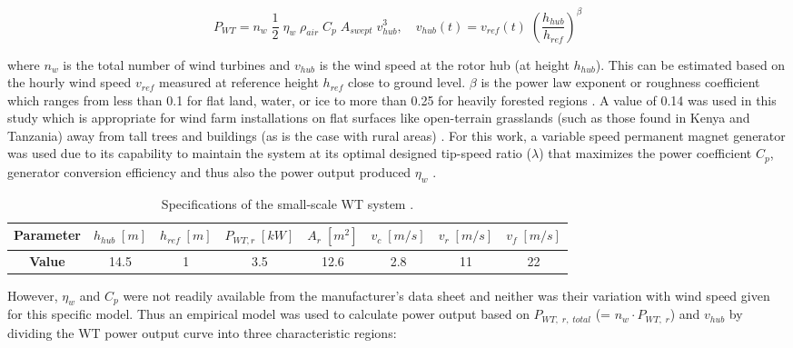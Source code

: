 \documentclass[final,3p,times]{elsarticle}
\begin{document}
\begin{equation}
\label{eq:Pwind}
    P_{WT} = n_w \; \frac{1}{2} \; \eta_w \; \rho_{air} \; C_p \; A_{swept} \; v_{hub}^3, \quad v_{hub}(t) = v_{ref}(t) \; \left(\frac{h_{hub}}{h_{ref}}\right)^\beta
\end{equation}

\noindent where $n_w$ is the total number of wind turbines and $v_{hub}$ is the wind speed at the rotor hub (at height $h_{hub}$). This can be estimated based on the hourly wind speed $v_{ref}$ measured at reference height $h_{ref}$ close to ground level. $\beta$ is the power law exponent or roughness coefficient which ranges from less than 0.1 for flat land, water, or ice to more than 0.25 for heavily forested regions \cite{kaabeche2011a}. A value of 0.14 was used in this study which is appropriate for wind farm installations on flat surfaces like open-terrain grasslands (such as those found in Kenya and Tanzania) away from tall trees and buildings (as is the case with rural areas) \cite{kaviani2009}. For this work, a variable speed permanent magnet generator was used due to its capability to maintain the system at its optimal designed tip-speed ratio ($\lambda$) that maximizes the power coefficient $C_p$, generator conversion efficiency and thus also the power output produced $\eta_w$ \cite{seeling1997}. 

\begin{table}[htbp]
\centering
\begin{tabular}{@{}cccccccc@{}}
\toprule
\textbf{Parameter} & $h_{hub} \; [m]$ & $h_{ref} \; [m]$ & $P_{WT,r} \; [kW]$ & $A_r \; [m^2]$ & $v_c \; [m/s]$ & $v_r \; [m/s]$ & $v_f \; [m/s]$ \\ \midrule
\textbf{Value}    & 14.5              & 1                  & 3.5                    & 12.6                                                & 2.8                & 11                                         & 22 \\ \bottomrule
\end{tabular}
\caption{Specifications of the small-scale WT system \cite{raum}.}
\label{tab:wt_spec}
\end{table}

However, $\eta_w$ and $C_p$ were not readily available from the manufacturer's data sheet and neither was their variation with wind speed given for this specific model. Thus an empirical model was used to calculate power output based on $P_{WT,\;r,\; total}$ (= $n_w \cdot P_{WT,\;r}$) and $v_{hub}$ by dividing the WT power output curve into three characteristic regions: 
\end{document}
